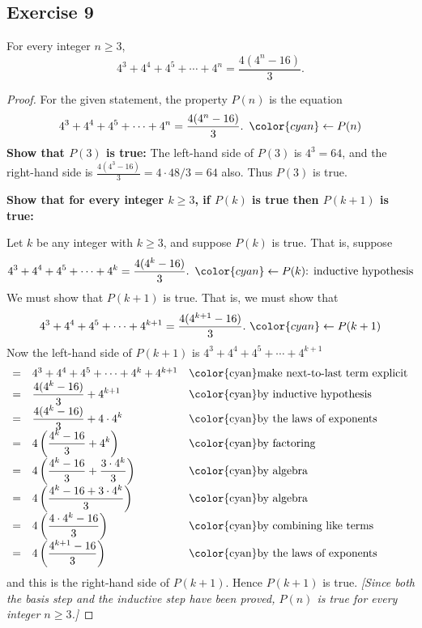 \documentclass[14pt]{extarticle}
\newcommand{\dps}{\displaystyle}
\newcommand{\from}{\leftarrow}
\newcommand{\cy}{\color{cyan}}
\begin{document}
\subsection{Exercise 9}
For every integer $n \geq 3$,
\[
    4^3 + 4^4 + 4^5 + \cdots + 4^n = \frac{4(4^n-16)}{3}.
\]
\begin{proof}
    For the given statement, the property $P(n)$ is the equation
    \[
        4^3 + 4^4 + 4^5 + \cdots + 4^n = \frac{4(4^n-16)}{3}. \,\,\, {\cy \from P(n)}
    \]
    {\bf Show that $P(3)$ is true:} The left-hand side of $P(3)$ is $4^3 = 64$, and the right-hand side is $\frac{4(4^3-16)}{3} = 4 \cdot 48 / 3 = 64$ also. Thus $P(3)$ is true.

        {\bf Show that for every integer $k \geq 3$, if $P(k)$ is true then $P(k + 1)$ is true:}

    Let $k$ be any integer with $k \geq 3$, and suppose $P(k)$ is true. That is, suppose
    \[
        4^3 + 4^4 + 4^5 + \cdots + 4^k = \frac{4(4^k-16)}{3}. \,\,\, {\cy \from P(k) \text{: inductive hypothesis}}
    \]
    We must show that $P(k + 1)$ is true. That is, we must show that
    \[
        4^3 + 4^4 + 4^5 + \cdots + 4^{k+1} = \frac{4(4^{k+1}-16)}{3}. \,\, {\cy \from P(k+1)}
    \]
    Now the left-hand side of $P(k + 1)$ is $4^3 + 4^4 + 4^5 + \cdots + 4^{k+1}$
    \[
        \begin{array}{lll}
            = & 4^3 + 4^4 + 4^5 + \cdots + 4^k + 4^{k+1}                    & \text{\cy make next-to-last term explicit} \\
            = & \dps \frac{4(4^k-16)}{3} + 4^{k+1}                          & \text{\cy by inductive hypothesis}         \\
            = & \dps \frac{4(4^k-16)}{3} + 4 \cdot 4^k                      & \text{\cy by the laws of exponents}        \\
            = & \dps 4\left(\frac{4^k-16}{3} + 4^k \right)                  & \text{\cy by factoring}                    \\
            = & \dps 4\left(\frac{4^k-16}{3} + \frac{3 \cdot 4^k}{3}\right) & \text{\cy by algebra}                      \\
            = & \dps 4\left(\frac{4^k-16 + 3 \cdot 4^k}{3}\right)           & \text{\cy by algebra}                      \\
            = & \dps 4\left(\frac{4 \cdot 4^k-16}{3}\right)                 & \text{\cy by combining like terms}         \\
            = & \dps 4\left(\frac{4^{k+1}-16}{3}\right)                     & \text{\cy by the laws of exponents}
        \end{array}
    \]
    and this is the right-hand side of $P(k + 1)$. Hence $P(k + 1)$ is true. {\it [Since both the basis step and the inductive step have been proved, $P(n)$ is true for every integer $n \geq 3$.]}
\end{proof}
\end{document}
